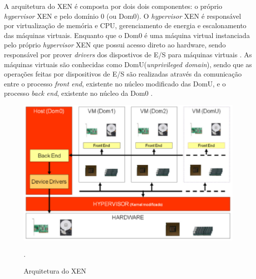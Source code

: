 A arquitetura do XEN é composta por dois dois componentes: o próprio \textit{hypervisor} XEN e pelo domínio 0 (ou Dom0). O \textit{hypervisor} XEN é responsável por virtualização de memória e CPU, gerenciamento de energia e escalonamento das máquinas virtuais. Enquanto que o Dom0 é uma máquina virtual instanciada pelo próprio \textit{hypervisor} XEN que possui acesso direto ao hardware, sendo responsável por prover \textit{drivers} dos dispostivos de E/S para máquinas virtuais \cite{redhatkvm}. As máquinas virtuais são conhecidas como DomU(\textit{unprivileged domain}), sendo que as operações feitas por dispositivos de E/S são realizadas através da comunicação entre o processo \textit{front end}, existente no núcleo modificado das DomU, e o processo \textit{back end}, existente no núcleo da Dom0 \cite{redhatkvm}.

\begin{figure}[!htb]
\centering
\includegraphics [keepaspectratio=true,scale=0.65]{figuras/xen_arquitecture.eps}
\caption{Arquitetura do XEN}
\cite{fabiano}.
\label{xen_arquitecture}
\end{figure}



